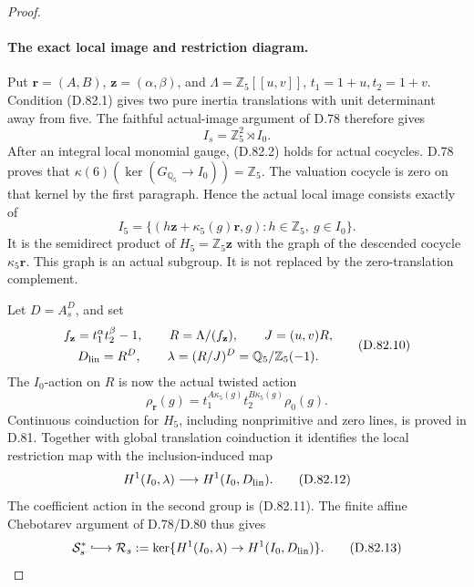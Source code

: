 \begin{proof}
\paragraph{The exact local image and restriction diagram.}
Put \(\mathbf r=(A,B)\), \(\mathbf z=(\alpha,\beta)\), and
\(\Lambda=\mathbb Z_5[[u,v]]\), \(t_1=1+u,t_2=1+v\).
Condition (D.82.1) gives two pure inertia translations with
unit determinant away from five. The faithful actual-image
argument of D.78 therefore gives
\[
                          I_s=\mathbb Z_5^2\rtimes I_0.
                                                               \tag{D.82.8}
\]
After an integral local monomial gauge, (D.82.2) holds for
actual cocycles. D.78 proves that
\(\kappa(6)(\ker(G_{\mathbb Q_5}\to I_0))=\mathbb Z_5\).
The valuation cocycle is zero on that kernel by the first
paragraph. Hence the actual local image consists exactly of
\[
 I_5=\{(h\mathbf z+\kappa_5(g)\mathbf r,g):
                              h\in\mathbb Z_5,\ g\in I_0\}.
                                                               \tag{D.82.9}
\]
It is the semidirect product of \(H_5=\mathbb Z_5\mathbf z\)
with the graph of the descended cocycle
\(\kappa_5\mathbf r\). This graph is an actual subgroup.
It is not replaced by the zero-translation complement.

Let \(D=A_s^D\), and set
\[
 \begin{gathered}
 f_{\mathbf z}=t_1^\alpha t_2^\beta-1,\qquad
 R=\Lambda/(f_{\mathbf z}),\qquad J=(u,v)R,\\
 D_{\rm lin}=R^D,\qquad
 \lambda=(R/J)^D=\mathbb Q_5/\mathbb Z_5(-1).
 \end{gathered}                                               \tag{D.82.10}
\]
The \(I_0\)-action on \(R\) is now the actual twisted action
\[
 \rho_{\mathbf r}(g)
        =t_1^{A\kappa_5(g)}t_2^{B\kappa_5(g)}\rho_0(g).
                                                               \tag{D.82.11}
\]
Continuous coinduction for \(H_5\), including nonprimitive
and zero lines, is proved in D.81. Together with global
translation coinduction it identifies the local restriction
map with the inclusion-induced map
\[
 H^1(I_0,\lambda)\longrightarrow
             H^1(I_0,D_{\rm lin}) .
                                                               \tag{D.82.12}
\]
The coefficient action in the second group is (D.82.11).
The finite affine Chebotarev argument of D.78/D.80 thus gives
\[
 \mathcal S_s^*\lhook\joinrel\longrightarrow
 \mathcal R_s:=
 \ker\{H^1(I_0,\lambda)\to H^1(I_0,D_{\rm lin})\}.
                                                               \tag{D.82.13}
\]


\end{proof}
